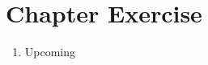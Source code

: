 \documentclass[../main.tex]{subfiles}
\begin{document}
    \section{Chapter Exercise}
    \begin{enumerate}
        \item Upcoming
    \end{enumerate}
\end{document}
